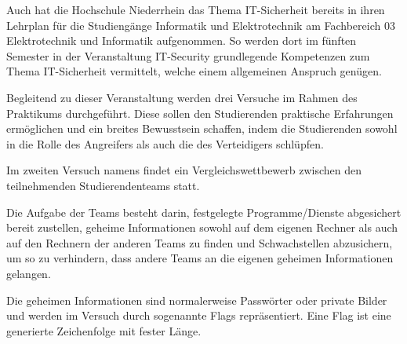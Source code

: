 Auch hat die Hochschule Niederrhein das Thema IT-Sicherheit bereits in ihren Lehrplan für die Studiengänge Informatik und Elektrotechnik am Fachbereich 03 Elektrotechnik und Informatik aufgenommen. So werden dort im fünften Semester in der Veranstaltung IT-Security grundlegende Kompetenzen zum Thema IT-Sicherheit vermittelt, welche einem allgemeinen Anspruch genügen. \cite{hochschuleniederrheinModulhandbuchVollzeitBA2019}

Begleitend zu dieser Veranstaltung werden drei Versuche im Rahmen des Praktikums durchgeführt. Diese sollen den Studierenden praktische Erfahrungen ermöglichen und ein breites Bewusstsein schaffen, indem die Studierenden sowohl in die Rolle des Angreifers als auch die des Verteidigers schlüpfen.

Im zweiten Versuch namens  findet ein Vergleichswettbewerb zwischen den teilnehmenden Studierendenteams statt.

Die Aufgabe der Teams besteht darin, festgelegte Programme/Dienste abgesichert bereit zustellen, geheime Informationen sowohl auf dem eigenen Rechner als auch auf den Rechnern der anderen Teams zu finden und Schwachstellen abzusichern, um so zu verhindern, dass andere Teams an die eigenen geheimen Informationen gelangen. \cite[S. 2]{sosnaKonzeptionUndRealisierung2010} 

Die geheimen Informationen sind normalerweise Passwörter oder private Bilder und werden im Versuch durch sogenannte Flags repräsentiert. Eine Flag ist eine generierte Zeichenfolge mit fester Länge.